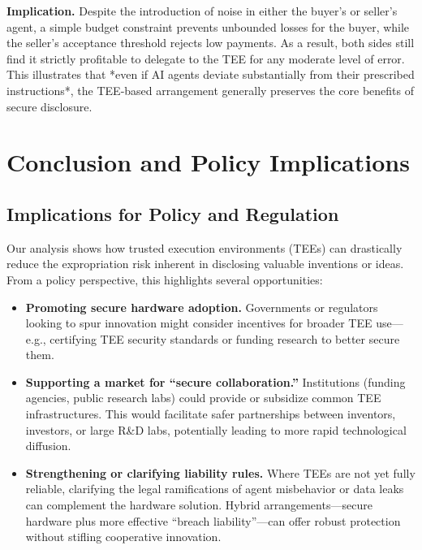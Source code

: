 \documentclass{article}
\begin{document}
\medskip

\noindent \textbf{Implication.} Despite the introduction of noise in either the buyer’s or seller’s agent, a simple budget constraint prevents unbounded losses for the buyer, while the seller’s acceptance threshold rejects low payments. As a result, both sides still find it strictly profitable to delegate to the TEE for any moderate level of error. This illustrates that *even if AI agents deviate substantially from their prescribed instructions*, the TEE‐based arrangement generally preserves the core benefits of secure disclosure.

\section{Conclusion and Policy Implications}
\label{sec:conclusion}
\subsection{Implications for Policy and Regulation}

Our analysis shows how trusted execution environments (TEEs) can drastically reduce the expropriation risk inherent in disclosing valuable inventions or ideas. From a policy perspective, this highlights several opportunities:

\begin{itemize}
    \item \textbf{Promoting secure hardware adoption.}
    Governments or regulators looking to spur innovation might consider incentives for broader TEE use—e.g., certifying TEE security standards or funding research to better secure them. 
    
    \item \textbf{Supporting a market for “secure collaboration.”}
    Institutions (funding agencies, public research labs) could provide or subsidize common TEE infrastructures. This would facilitate safer partnerships between inventors, investors, or large R\&D labs, potentially leading to more rapid technological diffusion.
    
    \item \textbf{Strengthening or clarifying liability rules.}
    Where TEEs are not yet fully reliable, clarifying the legal ramifications of agent misbehavior or data leaks can complement the hardware solution. Hybrid arrangements—secure hardware plus more effective “breach liability”—can offer robust protection without stifling cooperative innovation.
\end{itemize}
\end{document}
